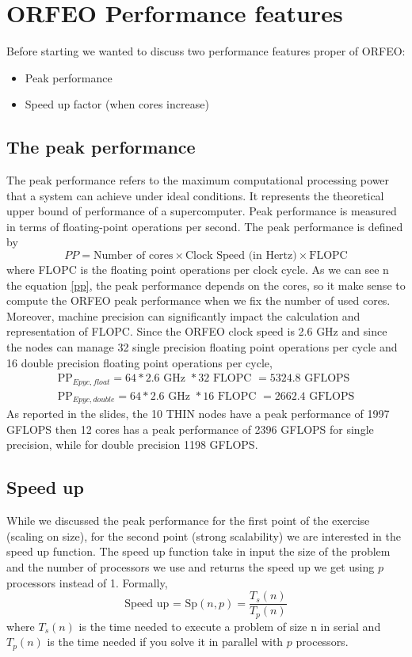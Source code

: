 \documentclass[12pt, titlepage]{report}
\begin{document}
\section{ORFEO Performance features}
Before starting we wanted to discuss two performance features proper of ORFEO:
\begin{itemize}
    \item Peak performance 
    \item Speed up factor (when cores increase)
\end{itemize}

\subsection{The peak performance}
The peak performance refers to the maximum computational processing power that a system can achieve under ideal conditions. It represents the theoretical upper bound of performance of a supercomputer. Peak performance is measured in terms of floating-point operations per second.
The peak performance is defined by
\begin{equation}
\label{pp}
PP = \text{Number of cores} \times \text{Clock Speed (in Hertz)} \times \text{FLOPC}    
\end{equation}
where FLOPC is the floating point operations per clock cycle.
As we can see n the equation \ref{pp}, the peak performance depends on the cores, so it make sense to compute the ORFEO peak performance when we fix the number of used cores.
Moreover, machine precision can significantly impact the calculation and representation of FLOPC.
Since the ORFEO clock speed is 2.6 GHz and since the nodes can manage 32 single precision floating point operations per cycle and 16 double precision floating point operations per cycle,
\begin{align}
\text{PP}_{Epyc,float} =   64 * 2.6 \text{ GHz } * 32 \text{ FLOPC }  = 5324.8 \text{ GFLOPS}\\
\text{PP}_{Epyc,double} =  64 * 2.6 \text{ GHz } * 16 \text{ FLOPC }  = 2662.4 \text{ GFLOPS}
\end{align}
As reported in the slides, the 10 THIN nodes have a peak performance of 1997 GFLOPS then 12 cores has a peak performance of 2396 GFLOPS for single precision, while for double precision 1198 GFLOPS.

\subsection{Speed up}
While we discussed the peak performance for the first point of the exercise (scaling on size), for the second point (strong scalability) we are interested in the speed up function. 
The speed up function take in input the size of the problem and the number of processors we use and returns the speed up we get using $p$ processors instead of 1. Formally,
\begin{equation}
    \text{Speed up = } \text{Sp}(n,p) = \frac{T_s(n)}{T_p(n)}
\end{equation}
where $T_s(n)$ is the time needed to execute a problem of size n in serial and $T_p(n)$ is the time needed if you solve it in parallel with $p$ processors.
\end{document}
